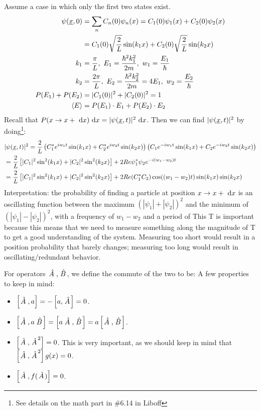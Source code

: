 \documentclass{school-22.101-notes}
\begin{document}
\clearpage
{}
Assume a case in which only the first two states exist. 
\begin{align}
\psi(\underline{x}, 0) &= \displaystyle\sum_n C_n (0) \psi_n(x)  = C_1 (0) \psi_1 (x) + C_2 (0) \psi_2 (x) \\
&= C_1 (0) \sqrt{\frac{2}{L}} \sin (k_1 x) + C_2 (0) \sqrt{\frac{2}{L}} \sin (k_2 x) \\
k_1 &= \frac{\pi}{L}, \mbox{ } E_1 = \frac{\hbar^2 k_1^2}{2m}, \mbox{ } w_1 = \frac{E_1}{\hbar} \\
k_2 &= \frac{2\pi}{L}, \mbox{ } E_2 = \frac{\hbar^2 k_2^2}{2m} = 4 E_1, \mbox{ } w_2 = \frac{E_2}{\hbar} \\
P(E_1) + P(E_2) &= |C_1 (0)|^2 + |C_2(0)|^2 = 1 \\
\left< E \right>  &=  P(E_1) \cdot E_1 + P(E_2) \cdot E_2
\end{align}
Recall that $P(x \to x+\mbox{ }\mathrm{d} x) \mbox{ }\mathrm{d} x = |\psi(\underline{x}, t)|^2 \mbox{ }\mathrm{d} x$. Then we can find $|\psi(\underline{x}, t)|^2$ by doing\footnote{See details on the math part in \#6.14 in Liboff}: 
\begin{align}
&|\psi(\underline{x}, t)|^2 = \frac{2}{L} \left( C_1^* e^{i w_1 t} \sin (k_1 x) + C_2^* e^{i w_2 t} \sin(k_2 x) \right) \left( C_1 e^{-i w_1 t} \sin (k_1 x) + C_2 e^{-i w_2 t} \sin(k_2 x) \right) \\
&= \frac{2}{L} \left[ |C_1|^2 \sin^2 (k_1 x) + |C_2|^2 \sin^2 (k_2 x) \right] + 2 Re \psi_1^* \psi_2 e^{-i(w_1 - w_2)t} \\
&= \frac{2}{L} \left[ |C_1|^2 \sin^2 (k_1 x) + |C_2|^2 \sin^2 (k_2 x) \right] + 2 Re(C_1^* C_2) \cos ((w_1 - w_2)t) \sin (k_1 x) \sin(k_2 x) 
\end{align}
Interpretation: the probability of finding a particle at position $x \to x + \mbox{ }\mathrm{d} x$ is an oscillating function between the maximum $(|\psi_1| + |\psi_2|)^2$ and the minimum of $(|\psi_1| - |\psi_2|)^2$, with a frequency of $w_1 - w_2$ and a period of 
This T is important because this means that we need to measure something along the magnitude of T to get a good understanding of the system. Measuring too short would result in a position probability that barely changes; measuring too long would result in oscillating/redundant behavior.

\clearpage
{}
For operators $\left. \hat{A} \right., \left. \hat{B} \right.$, we define the commute of the two to be:
A few properties to keep in mind:
\begin{itemize}
\item $ \left[ \left. \hat{A} \right., a \right] = - \left[ a, \left. \hat{A} \right. \right] = 0 $. 
\item $ \left[ \left. \hat{A} \right., a \left. \hat{B} \right. \right] = \left[ a \left. \hat{A} \right., \left. \hat{B} \right. \right] = a \left[ \left. \hat{A} \right., \left. \hat{B} \right. \right]$.
\item $ \left[ \left. \hat{A} \right., \left. \hat{A} \right.^2 \right] = 0 $. 
This is very important, as we should keep in mind that $\left[ \left. \hat{A} \right., \left. \hat{A} \right.^2 \right] g(x) = 0$. 
\item $ \left[ \left. \hat{A} \right., f(\left. \hat{A} \right.) \right] = 0$. 
\end{itemize}
\end{document}
